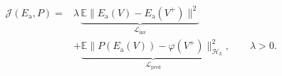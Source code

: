 \documentclass[border=4pt]{standalone}
\newcommand{\E}{\mathbb{E}}
\begin{document}
$\displaystyle
\begin{aligned}
 \mathcal J(E_{\mathrm a},P)
 ={}&\lambda\,\underbrace{\E\|E_{\mathrm a}(V)-E_{\mathrm a}(V^+)\|^2}_{\mathcal L_{\mathrm{inv}}}\\
 &+\underbrace{\E\|P(E_{\mathrm a}(V))-\varphi(V^+)\|_{\mathcal H_k}^2}_{\mathcal L_{\mathrm{pred}}},
 \qquad\lambda>0 .
 \end{aligned}
$
\end{document}
